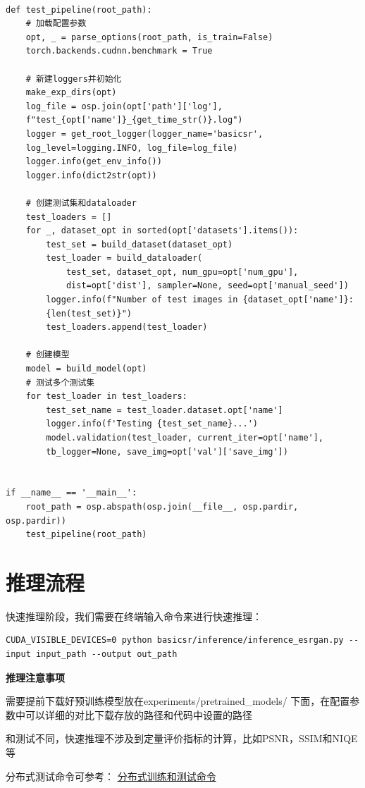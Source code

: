 \documentclass[../main.tex]{subfiles}
\begin{document}
\begin{verbatim}

def test_pipeline(root_path):
    # 加载配置参数
    opt, _ = parse_options(root_path, is_train=False)
    torch.backends.cudnn.benchmark = True

    # 新建loggers并初始化
    make_exp_dirs(opt)
    log_file = osp.join(opt['path']['log'],
    f"test_{opt['name']}_{get_time_str()}.log")
    logger = get_root_logger(logger_name='basicsr',
    log_level=logging.INFO, log_file=log_file)
    logger.info(get_env_info())
    logger.info(dict2str(opt))

    # 创建测试集和dataloader
    test_loaders = []
    for _, dataset_opt in sorted(opt['datasets'].items()):
        test_set = build_dataset(dataset_opt)
        test_loader = build_dataloader(
            test_set, dataset_opt, num_gpu=opt['num_gpu'],
            dist=opt['dist'], sampler=None, seed=opt['manual_seed'])
        logger.info(f"Number of test images in {dataset_opt['name']}:
        {len(test_set)}")
        test_loaders.append(test_loader)

    # 创建模型
    model = build_model(opt)
    # 测试多个测试集
    for test_loader in test_loaders:
        test_set_name = test_loader.dataset.opt['name']
        logger.info(f'Testing {test_set_name}...')
        model.validation(test_loader, current_iter=opt['name'],
        tb_logger=None, save_img=opt['val']['save_img'])


if __name__ == '__main__':
    root_path = osp.abspath(osp.join(__file__, osp.pardir, osp.pardir))
    test_pipeline(root_path)
\end{verbatim}


\section{推理流程}

快速推理阶段，我们需要在终端输入命令来进行快速推理：
\begin{verbatim}
CUDA_VISIBLE_DEVICES=0 python basicsr/inference/inference_esrgan.py --input input_path --output out_path
\end{verbatim}

\begin{hl} %

    \textbf{推理注意事项}

    需要提前下载好预训练模型放在experiments/pretrained\_models/ 下面，在配置参数中可以详细的对比下载存放的路径和代码中设置的路径

    和测试不同，快速推理不涉及到定量评价指标的计算，比如PSNR，SSIM和NIQE等

    分布式测试命令可参考：
\href{https://github.com/XPixelGroup/BasicSR/blob/master/docs/TrainTest.md}{分布式训练和测试命令}

\end{hl}
\end{document}
